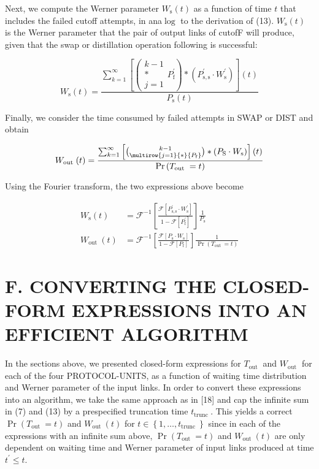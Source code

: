 \documentclass[10pt]{article}
\begin{document}
Next, we compute the Werner parameter $W_{\mathrm{s}}(t)$ as a function of time $t$ that includes the failed cutoff attempts, in ana$\log$ to the derivation of (13). $W_{\mathrm{s}}(t)$ is the Werner parameter that the pair of output links of cutofF will produce, given that the swap or distillation operation following is successful:

$$
W_{\mathrm{s}}(t)=\frac{\sum_{k=1}^{\infty}\left[\left(\begin{array}{c}
k-1 \\
* \\
j=1
\end{array} P_{\mathrm{f}}^{\prime}\right) *\left(P_{\mathrm{s}, \mathrm{s}}^{\prime} \cdot W_{\mathrm{s}}^{\prime}\right)\right](t)}{P_{\mathrm{s}}(t)}
$$

Finally, we consider the time consumed by failed attempts in SWAP or DIST and obtain

$$
W_{\text {out }}(t)=\frac{\sum_{k=1}^{\infty}\left[\binom{k-1}{\multirow{j=1}{*}{P_{\mathrm{f}}}} *\left(P_{\mathrm{S}} \cdot W_{\mathrm{s}}\right)\right](t)}{\operatorname{Pr}\left(T_{\text {out }}=t\right)}
$$

Using the Fourier transform, the two expressions above become

$$
\begin{aligned}
W_{\mathrm{s}}(t) & =\mathcal{F}^{-1}\left[\frac{\mathcal{F}\left[P_{\mathrm{s}, \mathrm{s}}^{\prime} \cdot W_{\mathrm{s}}^{\prime}\right]}{1-\mathcal{F}\left[P_{\mathrm{f}}^{\prime}\right]}\right] \frac{1}{P_{\mathrm{s}}} \\
W_{\text {out }}(t) & =\mathcal{F}^{-1}\left[\frac{\mathcal{F}\left[P_{\mathrm{s}} \cdot W_{\mathrm{s}}\right]}{1-\mathcal{F}\left[P_{\mathrm{f}}\right]}\right] \frac{1}{\operatorname{Pr}\left(T_{\text {out }}=t\right)}
\end{aligned}
$$

\section*{F. CONVERTING THE CLOSED-FORM EXPRESSIONS INTO AN EFFICIENT ALGORITHM}
In the sections above, we presented closed-form expressions for $T_{\text {out }}$ and $W_{\text {out }}$ for each of the four PROTOCOL-UNITS, as a function of waiting time distribution and Werner parameter of the input links. In order to convert these expressions into an algorithm, we take the same approach as in [18] and cap the infinite sum in (7) and (13) by a prespecified truncation time $t_{\text {trunc }}$. This yields a correct $\operatorname{Pr}\left(T_{\text {out }}=t\right)$ and $W_{\text {out }}(t)$ for $t \in\left\{1, \ldots, t_{\text {trunc }}\right\}$ since in each of the expressions with an infinite sum above, $\operatorname{Pr}\left(T_{\text {out }}=t\right)$ and $W_{\text {out }}(t)$ are only dependent on waiting time and Werner parameter of input links produced at time $t^{\prime} \leq t$.
\end{document}

